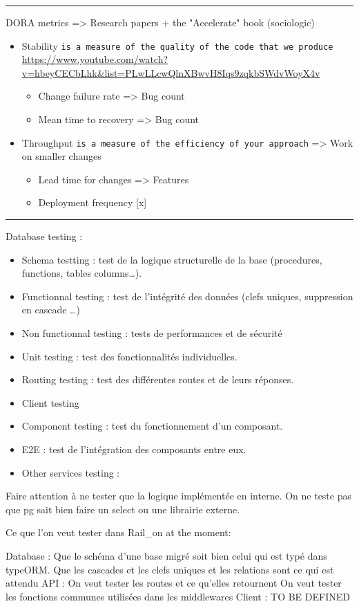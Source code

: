 \documentclass[a4paper,12pt]{article}
\begin{document}
\begin{multicols}{2}
\noindent\rule{\textwidth}{0.5pt}
DORA metrics => Research papers + the "Accelerate" book (sociologic)
\begin{itemize}
\item Stability \texttt{is a measure of the quality of the code that we produce}
\url{https://www.youtube.com/watch?v=hbeyCECbLhk\&list=PLwLLcwQlnXBwvH8Iqs9zqkbSWdvWoyX4v}
\begin{itemize}
\item Change failure rate => Bug count
\item Mean time to recovery => Bug count
\end{itemize}
\item Throughput \texttt{is a measure of the efficiency of your approach}
=> Work on smaller changes
\begin{itemize}
\item Lead time for changes => Features
\item Deployment frequency [x]
\end{itemize}
\end{itemize}

\noindent\rule{\textwidth}{0.5pt}
Database testing :
\begin{itemize}
\item Schema testting : test de la logique structurelle de la base (procedures, functions, tables columns…).
\item Functionnal testing : test de l’intégrité des données (clefs uniques, suppression en cascade …)
\item Non functionnal testing : tests de performances et de sécurité
\item Unit testing : test des fonctionnalités individuelles.
\item Routing testing : test des différentes routes et de leurs réponses.
\item Client testing
\item Component testing : test du fonctionnement d’un composant.
\item E2E : test de l’intégration des composants entre eux.
\item Other services testing :
\end{itemize}

Faire attention à ne tester que la logique implémentée en interne. On ne teste pas que pg sait bien faire un select ou une librairie externe.

Ce que l’on veut tester dans Rail\_on  at the moment:

Database :
Que le schéma d’une base migré soit bien celui qui est typé dans typeORM.
Que les cascades et les clefs uniques et les relations sont ce qui est attendu
API :
On veut tester les routes et ce qu’elles retournent
On veut tester les fonctions communes utilisées dans les middlewares
Client : TO BE DEFINED

\end{multicols}
\end{document}
